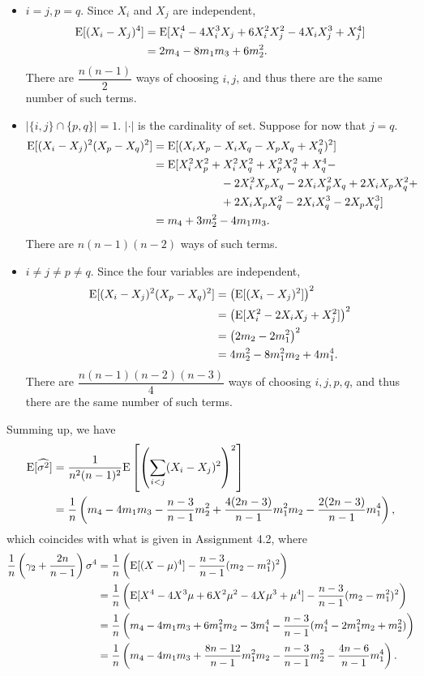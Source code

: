 \begin{itemize}
	\item \underline{$i = j, p = q$}.  Since $X_i$ and $X_j$ are independent,
	\begin{align*}
	\mathrm{E}[(X_i-X_j)^4] & = \mathrm{E}[X_i^4 - 4X_i^3X_j + 6X_i^2X_j^2 - 4X_iX_j^3 + X_j^4] \\
	& = 2m_4 - 8m_1m_3 + 6m_2^2.
	\end{align*}
	There are $\dfrac{n(n-1)}{2}$ ways of choosing $i, j$, and thus there are the same number of such terms.
	\item \underline{$|\{i, j\}\cap\{p, q\}| = 1$}. $|\cdot|$ is the cardinality of set. Suppose for now that $j = q$.
	\begin{align*}
	\mathrm{E}[(X_i-X_j)^2(X_p-X_q)^2] & = \mathrm{E}[(X_iX_p-X_iX_q-X_pX_q+X_q^2)^2] \\
	& = \mathrm{E}[X_i^2X_p^2 + X_i^2X_q^2 + X_p^2X_q^2 + X_q^4 -  \\
	& \qquad \qquad \qquad - 2X_i^2X_pX_q - 2X_iX_p^2X_q + 2X_iX_pX_q^2 + \\
	& \qquad \qquad \qquad + 2X_iX_pX_q^2 - 2X_iX_q^3 - 2X_pX_q^3 ] \\
	& = m_4 + 3m_2^2 - 4m_1m_3.
	\end{align*}
	There are $n(n-1)(n-2)$ ways of such terms.
	\item \underline{$i\neq j\neq p\neq q$}. Since the four variables are independent, 
	\begin{align*}
	\mathrm{E}[(X_i-X_j)^2(X_p-X_q)^2] & = \left(\mathrm{E}[(X_i-X_j)^2] \right)^2 \\
	& = \left(\mathrm{E}[X_i^2 - 2X_iX_j + X_j^2] \right)^2 \\
	& = \left(2m_2 - 2m_1^2 \right)^2 \\
	& = 4m_2^2 - 8m_1^2m_2 + 4m_1^4.
	\end{align*}
	There are $\dfrac{n(n-1)(n-2)(n-3)}{4}$ ways of choosing $i, j, p, q$, and thus there are the same number of such terms.
\end{itemize}
Summing up, we have
\begin{align*}
\mathrm{E}[\widehat{\sigma^2}] & = \frac{1}{n^2(n-1)^2}\mathrm{E}\left[\left(\sum_{i<j}(X_i-X_j)^2\right)^2 \right] \\
& = \frac{1}{n}\left(m_4 - 4m_1m_3 - \frac{n-3}{n-1}m_2^2 + \frac{4(2n-3)}{n-1}m_1^2m_2 - \frac{2(2n-3)}{n-1}m_1^4 \right),
\end{align*}
which coincides with what is given in Assignment 4.2, where 
\begin{align*}
\frac{1}{n}\left(\gamma_2 + \frac{2n}{n-1}\right)\sigma^4 & = \frac{1}{n}\left(\mathrm{E}[(X-\mu)^4] - \frac{n-3}{n-1}(m_2-m_1^2)^2 \right) \\
& = \frac{1}{n}\left(\mathrm{E}[X^4 - 4X^3\mu + 6X^2\mu^2 - 4X\mu^3 + \mu^4] - \frac{n-3}{n-1}(m_2-m_1^2)^2 \right) \\
& = \frac{1}{n}\left(m_4 - 4m_1m_3 + 6m_1^2m_2 - 3m_1^4 - \frac{n-3}{n-1}(m_1^4 - 2m_1^2m_2 + m_2^2) \right) \\
& = \frac{1}{n}\left(m_4 - 4m_1m_3 + \frac{8n-12}{n-1}m_1^2m_2 - \frac{n-3}{n-1}m_2^2 - \frac{4n-6}{n-1}m_1^4 \right).
\end{align*}

